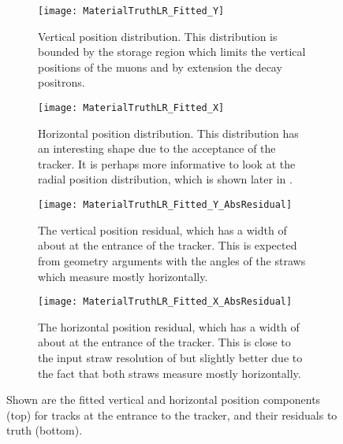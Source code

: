     \begin{figure}[]
    \centering
        \begin{subfigure}[t]{0.45\textwidth}
            \centering
            \texttt{[image: MaterialTruthLR\_Fitted\_Y]}
            \caption{Vertical position distribution. This distribution is bounded by the storage region which limits the vertical positions of the muons and by extension the decay positrons.}
        \end{subfigure}
        \hspace{5mm}
        \begin{subfigure}[t]{0.45\textwidth}
            \centering
            \texttt{[image: MaterialTruthLR\_Fitted\_X]}
            \caption{Horizontal position distribution. This distribution has an interesting shape due to the acceptance of the tracker. It is perhaps more informative to look at the radial position distribution, which is shown later in .}
        \end{subfigure}
        \vspace{2mm}
        \begin{subfigure}[t]{0.45\textwidth}
            \centering
            \texttt{[image: MaterialTruthLR\_Fitted\_Y\_AbsResidual]}
            \caption{The vertical position residual, which has a width of about  at the entrance of the tracker. This is expected from geometry arguments with the angles of the straws which measure mostly horizontally.}
        \end{subfigure}%
        \hspace{5mm}
        \begin{subfigure}[t]{0.45\textwidth}
            \centering
            \texttt{[image: MaterialTruthLR\_Fitted\_X\_AbsResidual]}
            \caption{The horizontal position residual, which has a width of about  at the entrance of the tracker. This is close to the input straw resolution of  but slightly better due to the fact that both straws measure mostly horizontally.}
        \end{subfigure}%
    \caption[Fitted track vertical and horizontal positions and corresponding residuals to truth]{Shown are the fitted vertical and horizontal position components (top) for tracks at the entrance to the tracker, and their residuals to truth (bottom).}
    \label{fig:MaterialFittedPositionComponents}
    \end{figure}


